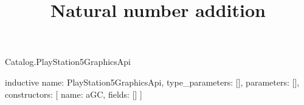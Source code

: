 \begin{lexlean}{Catalog.PlayStation5GraphicsApi}
\title{Natural number addition}
\begin{semanticmodule}
inductive{
  name: PlayStation5GraphicsApi,
  type_parameters: [],
  parameters: [],
  constructors: [
    {name: aGC, fields: []}
  ]
}
\end{semanticmodule}
\end{lexlean}
